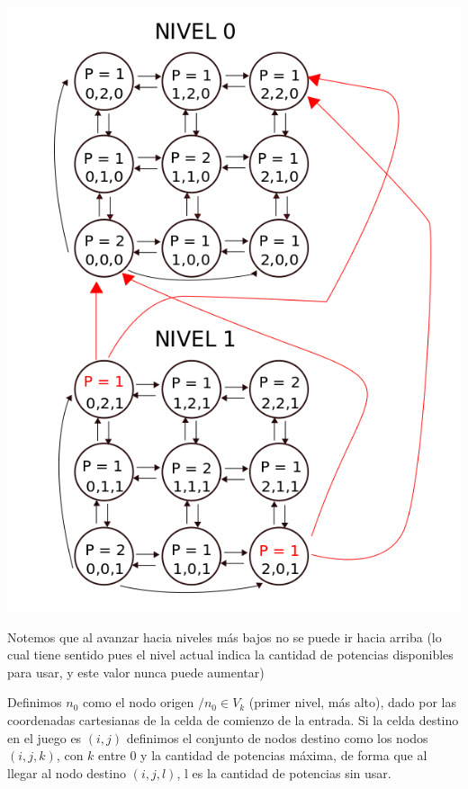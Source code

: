 \includegraphics[scale=0.5]{images/dospisos}

\vspace{2mm}

Notemos que al avanzar hacia niveles m\'as bajos no se puede ir hacia arriba (lo cual tiene sentido pues el nivel actual indica la cantidad de potencias disponibles para usar, y este valor nunca puede aumentar)

\vspace{2mm}

Definimos $n_0$ como el nodo origen $/ n_0 \in V_k$ (primer nivel, m\'as alto), dado por las coordenadas cartesianas de la celda de comienzo de la entrada. Si la celda destino en el juego es $(i,j)$ definimos el conjunto de nodos destino como los nodos $(i,j,k)$, con $k$ entre 0 y la cantidad de potencias m\'axima, de forma que al llegar al nodo destino $(i,j,l)$, l es la cantidad de potencias sin usar.

\vspace{2mm}

